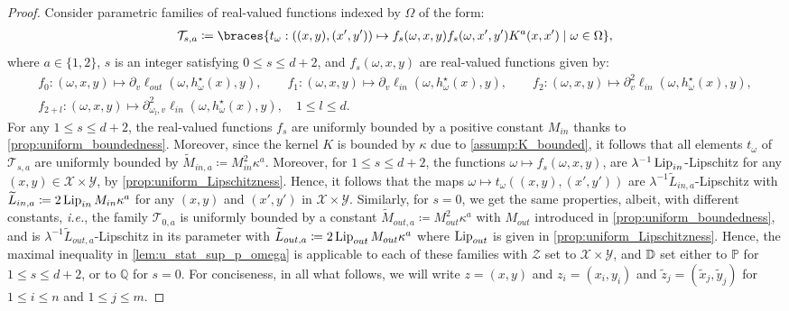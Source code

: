 \begin{proof}
Consider parametric families of real-valued functions indexed by $\Omega$ of the form:
\begin{align*}
	\mathcal{T}_{s,a}\coloneqq\braces{ t_{\omega}: ((x,y),(x',y'))\mapsto  f_s(\omega,x,y)f_s(\omega,x',y')K^{a}(x,x')\mid\omega\in \Omega },
\end{align*}
where $a\in \{1,2\}$,  $s$ is an integer satisfying {$0\leq s\leq d+2$}, and $f_s(\omega,x,y)$ are real-valued functions given by:
\begin{gather*}
	f_0: (\omega,x,y)\mapsto\partial_v \ell_{out}(\omega, h^\star_\omega(x), y),\qquad 
	f_1:(\omega,x,y)\mapsto\partial_v \ell_{in}(\omega, h^\star_\omega(x), y),\qquad
	f_2:(\omega,x,y)\mapsto\partial_v^2 \ell_{in}(\omega, h^\star_\omega(x), y),\\
	f_{2+l}: (\omega,x,y)\mapsto\partial_{\omega_l, v}^2 \ell_{in}(\omega, h^\star_\omega(x), y), \quad 1\leq l\leq d.
\end{gather*}
For any $1\leq s\leq d+2$, the real-valued functions $f_s$ are uniformly bounded by a positive constant $M_{in}$ thanks to {\cref{prop:uniform_boundedness}}. Moreover, since the kernel $K$ is bounded by {$\kappa$ due to \cref{assump:K_bounded}}, it follows that all elements $t_{\omega}$ of $\mathcal{T}_{s,a}$ are uniformly bounded by {$\widetilde{M}_{in,a}\coloneqq M_{in}^2\kappa^a$}. Moreover, for $1\leq s\leq d+2$, the functions $\omega\mapsto f_{s}(\omega,x,y)$, are $\lambda^{-1}\operatorname{Lip}_{in}$-Lipschitz for any $(x,y)\in\mathcal{X}\times\mathcal{Y}$, by {\cref{prop:uniform_Lipschitzness}}. Hence, it follows that the maps $\omega\mapsto t_{\omega}((x,y),(x',y'))$ are $\lambda^{-1}\widetilde{L}_{in,a}$-Lipschitz with {$\widetilde{L}_{in,a}\coloneqq 2\operatorname{Lip}_{in} M_{in}\kappa^a$} for any $(x,y)$ and $(x',y')$ in $\mathcal{X}\times \mathcal{Y}$. Similarly, for $s=0$, we get the same properties, albeit, with different constants, \textit{i.e.}, the family {$\mathcal{T}_{0,a}$} is uniformly bounded by a constant {$\widetilde{M}_{out,a}\coloneqq M_{out}^2\kappa^a$} with {$M_{out}$ introduced in \cref{prop:uniform_boundedness}}, and is $\lambda^{-1}\widetilde{L}_{out,a}$-Lipschitz in its parameter with {$\widetilde{L}_{out,a}\coloneqq 2\operatorname{Lip}_{out} M_{out}\kappa^a$} where $\operatorname{Lip}_{out}$ is given in {\cref{prop:uniform_Lipschitzness}}.
Hence, the maximal inequality in \cref{lem:u_stat_sup_p_omega} is applicable to each of these families with $\mathcal{Z}$ set to $\mathcal{X}\times \mathcal{Y}$, and {$\mathbb{D}$ set either to $\mathbb{P}$ for $1\leq s\leq d+2$, or to $\mathbb{Q}$ for $s=0$}.
For conciseness, in all what follows, we will write $z = (x,y)$ and $z_i = (x_i,y_i)$ and $\tilde{z}_j = (\tilde{x}_j,\tilde{y}_j)$ for $1\leq i\leq n$ and $1\leq j\leq m$. 


\end{proof}
